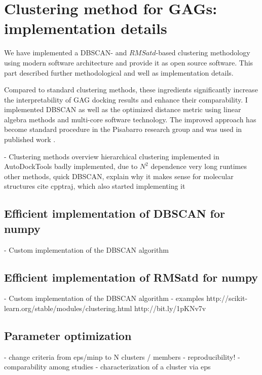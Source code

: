 \section{Clustering method for GAGs: implementation details}

We have implemented a DBSCAN- and $RMSatd$-based clustering methodology using
modern software architecture and provide it as open source software. This part
described further methodological and well as implementation details.


Compared to standard clustering methods, these ingredients significantly
increase the interpretability of GAG docking results and enhance their
comparability. I implemented DBSCAN as well as the optimized distance metric
using linear algebra methods and multi-core software technology. The improved
approach has become standard procedure in the Pisabarro research group and was
used in published work \cite{franz_cathepsin_2013}.


    - Clustering methods overview
        hierarchical clustering implemented in AutoDockTools
            badly implemented, due to $N^2$ dependence very long runtimes
        other methods, quick
        DBSCAN, explain why it makes sense for molecular structures
        cite cpptraj, which also started implementing it





\subsection{Efficient implementation of DBSCAN for numpy}

        - Custom implementation of the DBSCAN algorithm

\subsection{Efficient implementation of RMSatd for numpy}

        - Custom implementation of the DBSCAN algorithm
        - examples
            http://scikit-learn.org/stable/modules/clustering.html
            http://bit.ly/1pKNv7v


\subsection{Parameter optimization}


        - change criteria from eps/minp to N clusters / members
        - reproducibility!
        - comparability among studies
        - characterization of a cluster via eps


